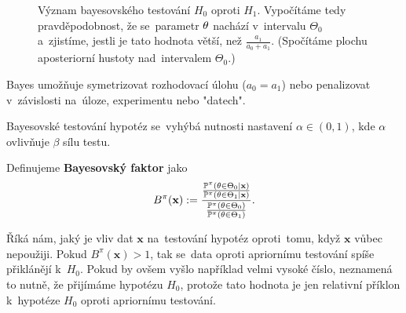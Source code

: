 \begin{figure}[h]
\centering
\caption{Význam bayesovského testování $H_0$ oproti $H_1$. Vypočítáme tedy pravděpodobnost, že se~parametr $\theta$ nachází v~intervalu $\Theta_0$ a~zjistíme, jestli je tato hodnota větší, než $\frac{a_1}{a_0+a_1}$. (Spočítáme plochu aposteriorní hustoty nad~intervalem $\Theta_0$.)}
\label{fig:last0x}
\end{figure}
\begin{remark}
	Bayes umožňuje symetrizovat rozhodovací úlohu ($a_0=a_1$) nebo penalizovat v~závislosti na~úloze, experimentu nebo "datech".
	
	Bayesovské testování hypotéz se~vyhýbá nutnosti nastavení $\alpha\in(0,1)$, kde $\alpha$ ovlivňuje $\beta$ sílu testu.
\end{remark}
\begin{define}
	Definujeme \textbf{Bayesovský faktor} jako$$ B^\pi(\textbf{x}):=\frac{\frac{\mathbb{P}^\pi(\theta\in\Theta_0|\textbf{x})}{\mathbb{P}^\pi(\theta\in\Theta_1|\textbf{x})}}{\frac{\mathbb{P}^\pi(\theta\in\Theta_0)}{\mathbb{P}^\pi(\theta\in\Theta_1)}}.$$
\end{define}
\begin{remark}
		Říká nám, jaký je vliv dat $\textbf{x}$ na~testování hypotéz oproti~tomu, když $\textbf{x}$ vůbec nepoužiji. Pokud $B^\pi(\textbf{x})>1$, tak se~data oproti apriornímu testování spíše přiklánějí k~$H_0$. Pokud by ovšem vyšlo například velmi vysoké číslo, neznamená to nutně, že přijímáme hypotézu $H_0$, protože tato hodnota je jen relativní příklon k~hypotéze $H_0$ oproti apriornímu testování.
\end{remark}
